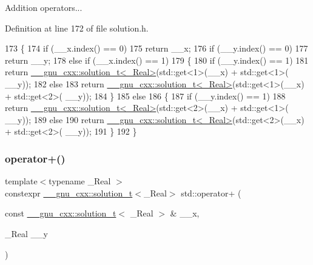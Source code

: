 Addition operators... 

Definition at line 172 of file solution.\+h.


\begin{DoxyCode}
173     \{
174       \textcolor{keywordflow}{if} (\_\_x.index() == 0)
175         \textcolor{keywordflow}{return} \_\_x;
176       \textcolor{keywordflow}{if} (\_\_y.index() == 0)
177         \textcolor{keywordflow}{return} \_\_y;
178       \textcolor{keywordflow}{else} \textcolor{keywordflow}{if} (\_\_x.index() == 1)
179         \{
180           \textcolor{keywordflow}{if} (\_\_y.index() == 1)
181             \textcolor{keywordflow}{return} \hyperlink{namespace____gnu__cxx_ae20ea642de50eb361074c62676b0159c}{\_\_gnu\_cxx::solution\_t<\_Real>}(std::get<1>(\_\_x) + std::get<1>(
      \_\_y));
182           \textcolor{keywordflow}{else}
183             \textcolor{keywordflow}{return} \hyperlink{namespace____gnu__cxx_ae20ea642de50eb361074c62676b0159c}{\_\_gnu\_cxx::solution\_t<\_Real>}(std::get<1>(\_\_x) + std::get<2>(
      \_\_y));
184         \}
185       \textcolor{keywordflow}{else}
186         \{
187           \textcolor{keywordflow}{if} (\_\_y.index() == 1)
188             \textcolor{keywordflow}{return} \hyperlink{namespace____gnu__cxx_ae20ea642de50eb361074c62676b0159c}{\_\_gnu\_cxx::solution\_t<\_Real>}(std::get<2>(\_\_x) + std::get<1>(
      \_\_y));
189           \textcolor{keywordflow}{else}
190             \textcolor{keywordflow}{return} \hyperlink{namespace____gnu__cxx_ae20ea642de50eb361074c62676b0159c}{\_\_gnu\_cxx::solution\_t<\_Real>}(std::get<2>(\_\_x) + std::get<2>(
      \_\_y));
191         \}
192     \}
\end{DoxyCode}
\mbox{\label{namespacestd_a57af80492f51cac0e5c9cde7ea2ca845}} 
\subsubsection{\texorpdfstring{operator+()}{operator+()}\hspace{0.1cm}{\footnotesize\ttfamily [3/6]}}
{\footnotesize\ttfamily template$<$typename \+\_\+\+Real $>$ \\
constexpr \hyperlink{namespace____gnu__cxx_ae20ea642de50eb361074c62676b0159c}{\+\_\+\+\_\+gnu\+\_\+cxx\+::solution\+\_\+t}$<$\+\_\+\+Real$>$ std\+::operator+ (\begin{DoxyParamCaption}\item[{const \hyperlink{namespace____gnu__cxx_ae20ea642de50eb361074c62676b0159c}{\+\_\+\+\_\+gnu\+\_\+cxx\+::solution\+\_\+t}$<$ \+\_\+\+Real $>$ \&}]{\+\_\+\+\_\+x,  }\item[{\+\_\+\+Real}]{\+\_\+\+\_\+y }\end{DoxyParamCaption})}



